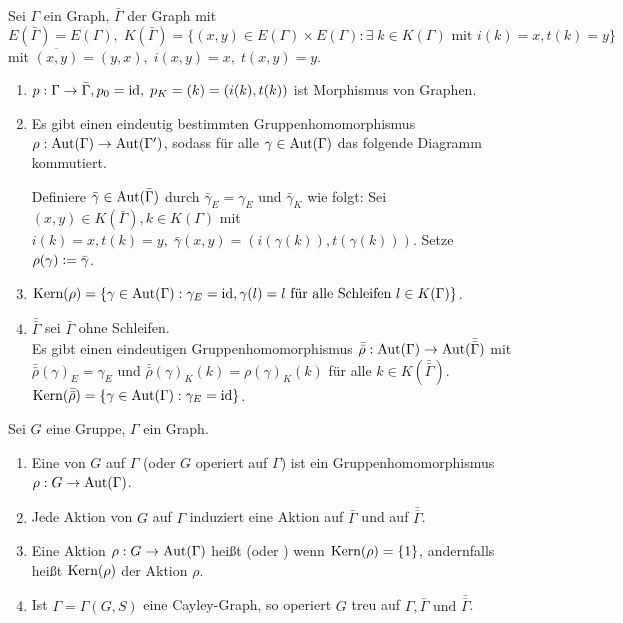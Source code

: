 \documentclass[a4paper, 10pt]{report}
\begin{document}
\begin{Bem}
Sei $\Gamma$ ein Graph, $\bar{\Gamma}$ der Graph mit $E(\bar{\Gamma}) =
E(\Gamma), \; K(\bar{\Gamma})=\{(x,y) \in E(\Gamma) \times E(\Gamma): \exists\;k
\in K(\Gamma) \textrm{ mit }i(k)=x, t(k)=y\}$ mit $\overline{(x,y)} = (y,x),\;
i(x,y)=x,\;t(x,y)=y$.
\begin{enumerate}
  \item $p: \Gamma \to \bar{\Gamma}, p_0=\textrm{id}, \; p_K=(k)=(i(k),t(k))$ ist
  Morphismus von Graphen.
  \item Es gibt einen eindeutig bestimmten Gruppenhomomorphismus $\rho:
  \mbox{Aut}(\Gamma) \to \mbox{Aut}(\Gamma')$, sodass für alle $\gamma \in \mbox{Aut}(\Gamma)$ das
  folgende Diagramm kommutiert.
  \begin{Bew}
  Definiere $\bar{\gamma} \in \mbox{Aut}(\bar{\Gamma})$ durch $\bar{\gamma}_E =
  \gamma_E$ und $\bar{\gamma}_K$ wie folgt:
  Sei $(x,y) \in K(\bar{\Gamma}), k \in K(\Gamma)$ mit $i(k)=x, t(k)=y, \; 
  \bar{\gamma}(x,y)=(i(\gamma(k)),t(\gamma(k)))$. Setze $\rho(\gamma) \mathrel{\mathop:}=
  \bar{\gamma}$.
  \end{Bew}
  \item $\mbox{Kern}(\rho) = \{ \gamma \in \mbox{Aut}(\Gamma): \gamma_E = \textrm{id}, \gamma(l)=l
  \textrm{ für alle Schleifen } l \in K(\Gamma)\}$.
  \item $\bar{\bar{\Gamma}}$ sei $\bar{\Gamma}$ ohne Schleifen.\\
  Es gibt einen eindeutigen Gruppenhomomorphismus $\bar{\bar{\rho}}:
  \mbox{Aut}(\Gamma) \to \mbox{Aut}(\bar{\bar{\Gamma}})$ mit $\bar{\bar{\rho}}(\gamma)_E =
  \gamma_E$ und $\bar{\bar{\rho}}(\gamma)_K(k) = \rho(\gamma)_K(k)$ für alle $k
  \in K(\bar{\bar{\Gamma}})$.\\
  $\mbox{Kern}(\bar{\bar{\rho}}) = \{ \gamma \in \mbox{Aut}(\Gamma): \gamma_E = \textrm{id}\}$.
\end{enumerate}
\end{Bem}


\begin{DefFolg} 
Sei $G$ eine Gruppe, $\Gamma$ ein Graph.
\begin{enumerate}
  \item Eine  von $G$ auf $\Gamma$ (oder $G$ operiert
  auf $\Gamma$) ist ein Gruppenhomomorphismus $\rho: G \to \mbox{Aut}(\Gamma)$.
  \item Jede Aktion von $G$ auf $\Gamma$ induziert eine Aktion auf
  $\bar{\Gamma}$ und auf $\bar{\bar{\Gamma}}$.
  \item Eine Aktion $\rho: G \to \mbox{Aut}(\Gamma)$ heißt 
  (oder ) wenn $\mbox{Kern}(\rho) = \{1\}$,
  andernfalls heißt $\mbox{Kern}(\rho)$
   der Aktion $\rho$.
  \item Ist $\Gamma = \Gamma(G,S)$ eine Cayley-Graph, so operiert $G$ treu auf
  $\Gamma, \bar{\Gamma} \textrm{ und }\bar{\bar{\Gamma}}$.
\end{enumerate}
\end{DefFolg}
\end{document}
